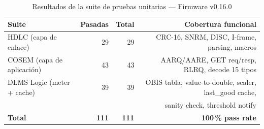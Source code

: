 
\begin{table}[htbp]
\centering
\caption{Resultados de la suite de pruebas unitarias — Firmware v0.16.0}
\label{tab:unit-tests-v016}
\begin{tabular}{l r r r}
\toprule
\textbf{Suite} & \textbf{Pasadas} & \textbf{Total} & \textbf{Cobertura funcional} \\
\midrule
HDLC (capa de enlace) & 29 & 29 & CRC-16, SNRM, DISC, I-frame, parsing, macros \\
COSEM (capa de aplicación) & 43 & 43 & AARQ/AARE, GET req/resp, RLRQ, decode 15 tipos \\
DLMS Logic (meter + cache) & 39 & 39 & OBIS tabla, value-to-double, scaler, last\_good cache, \\
 & & & sanity check, threshold notify \\
\midrule
\textbf{Total} & \textbf{111} & \textbf{111} & \textbf{100\,\% pass rate} \\
\bottomrule
\end{tabular}
\end{table}
